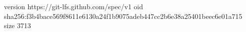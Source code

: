 version https://git-lfs.github.com/spec/v1
oid sha256:f3b4bace569f8611e6130a24f1b9075adeb447cc2b6e38a25401beec6e01a715
size 3713
